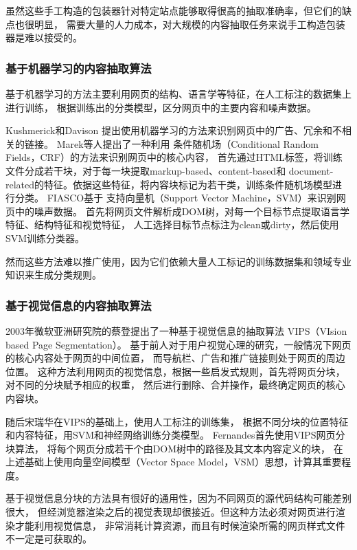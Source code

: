 虽然这些手工构造的包装器针对特定站点能够取得很高的抽取准确率，但它们的缺点也很明显，
需要大量的人力成本，对大规模的内容抽取任务来说手工构造包装器是难以接受的。

\subsubsection{基于机器学习的内容抽取算法}

基于机器学习的方法主要利用网页的结构、语言学等特征，在人工标注的数据集上进行训练，
根据训练出的分类模型，区分网页中的主要内容和噪声数据。

Kushmerick和Davison
提出使用机器学习的方法来识别网页中的广告、冗余和不相关的链接。
Marek等人提出了一种利用
条件随机场（Conditional Random Fields，CRF）的方法来识别网页中的核心内容，
首先通过HTML标签，将训练文件分成若干块，对于每一块提取markup-based、content-based和
document-related的特征。依据这些特征，将内容块标记为若干类，训练条件随机场模型进行分类。
FIASCO基于
支持向量机（Support Vector Machine，SVM）来识别网页中的噪声数据。
首先将网页文件解析成DOM树，对每一个目标节点提取语言学特征、结构特征和视觉特征，
人工选择目标节点标注为clean或dirty，然后使用SVM训练分类器。

然而这些方法难以推广使用，因为它们依赖大量人工标记的训练数据集和领域专业知识来生成分类规则。

\subsubsection{基于视觉信息的内容抽取算法}

2003年微软亚洲研究院的蔡登提出了一种基于视觉信息的抽取算法
VIPS（VIsion based Page Segmentation）。
基于前人对于用户视觉心理的研究，一般情况下网页的核心内容处于网页的中间位置，
而导航栏、广告和推广链接则处于网页的周边位置。
这种方法利用网页的视觉信息，根据一些启发式规则，首先将网页分块，对不同的分块赋予相应的权重，
然后进行删除、合并操作，最终确定网页的核心内容块。

随后宋瑞华在VIPS的基础上，使用人工标注的训练集，
根据不同分块的位置特征和内容特征，用SVM和神经网络训练分类模型。
Fernandes首先使用VIPS网页分块算法，
将每个网页分成若干个由DOM树中的路径及其文本内容定义的块，
在上述基础上使用向量空间模型（Vector Space Model，VSM）思想，计算其重要程度。

基于视觉信息分块的方法具有很好的通用性，因为不同网页的源代码结构可能差别很大，
但经浏览器渲染之后的视觉表现却很接近。但这种方法必须对网页进行渲染才能利用视觉信息，
非常消耗计算资源，而且有时候渲染所需的网页样式文件不一定是可获取的。

